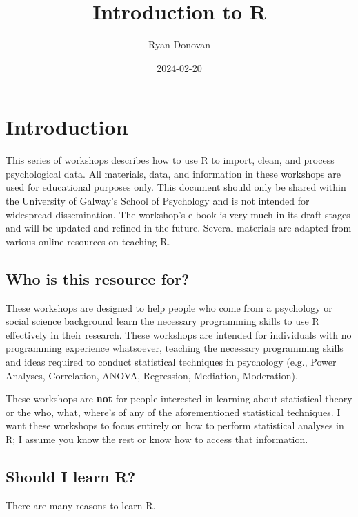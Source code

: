 \documentclass[
]{book}
\title{Introduction to R}
\author{Ryan Donovan}
\date{2024-02-20}
\begin{document}
\maketitle

{
\setcounter{tocdepth}{1}
\tableofcontents
}
\hypertarget{introduction}{%
\chapter{\texorpdfstring{\textbf{Introduction}}{Introduction}}\label{introduction}}

This series of workshops describes how to use R to import, clean, and process psychological data. All materials, data, and information in these workshops are used for educational purposes only. This document should only be shared within the University of Galway's School of Psychology and is not intended for widespread dissemination. The workshop's e-book is very much in its draft stages and will be updated and refined in the future. Several materials are adapted from various online resources on teaching R.

\hypertarget{who-is-this-resource-for}{%
\section{Who is this resource for?}\label{who-is-this-resource-for}}

These workshops are designed to help people who come from a psychology or social science background learn the necessary programming skills to use R effectively in their research. These workshops are intended for individuals with no programming experience whatsoever, teaching the necessary programming skills and ideas required to conduct statistical techniques in psychology (e.g., Power Analyses, Correlation, ANOVA, Regression, Mediation, Moderation).

These workshops are \textbf{not} for people interested in learning about statistical theory or the who, what, where's of any of the aforementioned statistical techniques. I want these workshops to focus entirely on how to perform statistical analyses in R; I assume you know the rest or know how to access that information.

\hypertarget{should-i-learn-r}{%
\section{Should I learn R?}\label{should-i-learn-r}}

There are many reasons to learn R.
\end{document}
